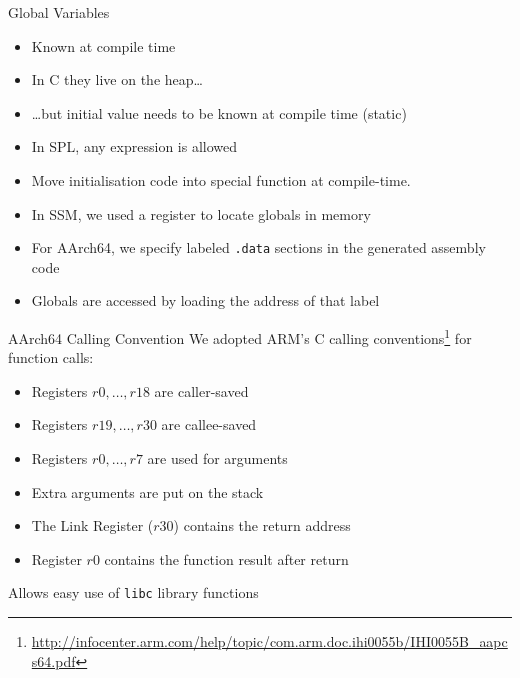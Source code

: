\documentclass[department=icis, slidenumbers=slide, official=true]{beamerruhuisstijl}
\begin{document}
\begin{frame}{Global Variables}
    \begin{itemize}
        \item Known at compile time
        \item In C they live on the heap\ldots
        \item \ldots but initial value needs to be known at compile time (static)
        \item In SPL, any expression is allowed
        \item Move initialisation code into special function at compile-time.

        \pause
        \vspace{1em}

        \item In SSM, we used a register to locate globals in memory
        \item For AArch64, we specify labeled \texttt{.data} sections in the generated assembly code 
        \item Globals are accessed by loading the address of that label
    \end{itemize}
\end{frame}

\begin{frame}{AArch64 Calling Convention}
    We adopted ARM's C calling conventions\footnote{\url{http://infocenter.arm.com/help/topic/com.arm.doc.ihi0055b/IHI0055B_aapcs64.pdf}} for function calls:
    \begin{itemize}
        \item Registers $r0, \ldots, r18$ are caller-saved
        \item Registers $r19, \ldots, r30$ are callee-saved
        \item Registers $r0, \ldots, r7$ are used for arguments
        \item Extra arguments are put on the stack
        \item The Link Register ($r30$) contains the return address
        \item Register $r0$ contains the function result after return
    \end{itemize}

    \vspace{3em}
    Allows easy use of \texttt{libc} library functions
\end{frame}
\end{document}
